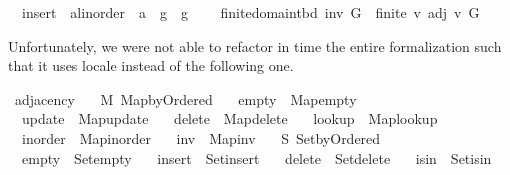 \begin{isabellebody}
\ \ insert\ {\isacharcolon}{\kern0pt}{\isacharcolon}{\kern0pt}\ {\isachardoublequoteopen}{\isacharprime}{\kern0pt}a{\isacharcolon}{\kern0pt}{\isacharcolon}{\kern0pt}linorder\ {\isasymRightarrow}\ {\isacharprime}{\kern0pt}a\ {\isasymRightarrow}\ {\isacharprime}{\kern0pt}g\ {\isasymRightarrow}\ {\isacharprime}{\kern0pt}g{\isachardoublequoteclose}\ {\isacharplus}{\kern0pt}\isanewline
\ \ \ finite{\isacharunderscore}{\kern0pt}domain{\isacharunderscore}{\kern0pt}tbd{\isacharcolon}{\kern0pt}\ {\isachardoublequoteopen}inv\ G\ {\isasymLongrightarrow}\ finite\ {\isacharbraceleft}{\kern0pt}v{\isachardot}{\kern0pt}\ adj\ v\ G\ {\isasymnoteq}\ {\isacharbrackleft}{\kern0pt}{\isacharbrackright}{\kern0pt}{\isacharbraceright}{\kern0pt}{\isachardoublequoteclose}%
\begin{isamarkuptext}%
Unfortunately, we were not able to refactor in time the entire formalization such that it uses
locale  instead of the following one.%
\end{isamarkuptext}\isamarkuptrue%
\isamarkupfalse%
\ adjacency\ {\isacharequal}{\kern0pt}\isanewline
\ \ M{\isacharcolon}{\kern0pt}\ Map{\isacharunderscore}{\kern0pt}by{\isacharunderscore}{\kern0pt}Ordered\ \isanewline
\ \ empty\ {\isacharequal}{\kern0pt}\ Map{\isacharunderscore}{\kern0pt}empty\ \isanewline
\ \ update\ {\isacharequal}{\kern0pt}\ Map{\isacharunderscore}{\kern0pt}update\ \isanewline
\ \ delete\ {\isacharequal}{\kern0pt}\ Map{\isacharunderscore}{\kern0pt}delete\ \isanewline
\ \ lookup\ {\isacharequal}{\kern0pt}\ Map{\isacharunderscore}{\kern0pt}lookup\ \isanewline
\ \ inorder\ {\isacharequal}{\kern0pt}\ Map{\isacharunderscore}{\kern0pt}inorder\ \isanewline
\ \ inv\ {\isacharequal}{\kern0pt}\ Map{\isacharunderscore}{\kern0pt}inv\ {\isacharplus}{\kern0pt}\isanewline
\ \ S{\isacharcolon}{\kern0pt}\ Set{\isacharunderscore}{\kern0pt}by{\isacharunderscore}{\kern0pt}Ordered\ \isanewline
\ \ empty\ {\isacharequal}{\kern0pt}\ Set{\isacharunderscore}{\kern0pt}empty\ \isanewline
\ \ insert\ {\isacharequal}{\kern0pt}\ Set{\isacharunderscore}{\kern0pt}insert\ \isanewline
\ \ delete\ {\isacharequal}{\kern0pt}\ Set{\isacharunderscore}{\kern0pt}delete\ \isanewline
\ \ isin\ {\isacharequal}{\kern0pt}\ Set{\isacharunderscore}{\kern0pt}isin\ \isanewline

\end{isabellebody}
